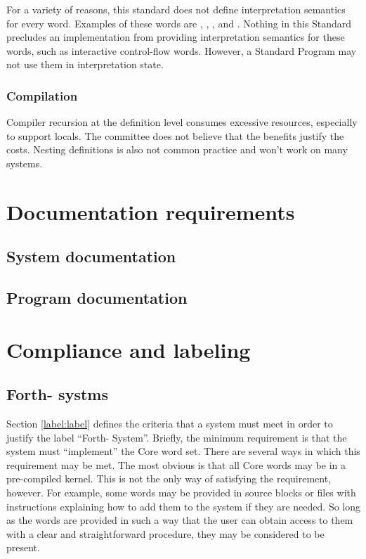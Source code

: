 For a variety of reasons, this standard does not define interpretation
semantics for every word. Examples of these words are ,
, , and . Nothing in this Standard precludes
an implementation from providing interpretation semantics for these
words, such as interactive control-flow words. However, a Standard
Program may not use them in interpretation state.

\addtocounter{subsubsection}{1}
\subsubsection{Compilation} %

Compiler recursion at the definition level consumes excessive
resources, especially to support locals. The committee does not
believe that the benefits justify the costs. Nesting definitions
is also not common practice and won't work on many systems.

\section{Documentation requirements} %

\subsection{System documentation} %

\subsection{Program documentation} %

\section{Compliance and labeling} %

\subsection{Forth-\snapshot{} systms} %

Section \ref{label:label} defines the criteria that a system must
meet in order to justify the label ``Forth-\snapshot{} System''. Briefly,
the minimum requirement is that the system must ``implement'' the
Core word set. There are several ways in which this requirement may
be met. The most obvious is that all Core words may be in a pre-compiled
kernel. This is not the only way of satisfying the requirement,
however. For example, some words may be provided in source blocks or
files with instructions explaining how to add them to the system if
they are needed. So long as the words are provided in such a way that
the user can obtain access to them with a clear and straightforward
procedure, they may be considered to be present.

